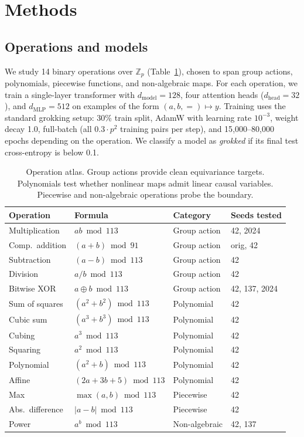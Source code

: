 \documentclass{article}
\newcommand{\Z}{\mathbb{Z}}
\begin{document}
\section{Methods}
\label{sec:methods}

\subsection{Operations and models}

We study 14 binary operations over $\Z_p$ (Table~\ref{tab:operations}), chosen
to span group actions, polynomials, piecewise functions, and non-algebraic maps.
For each operation, we train a single-layer transformer with
$d_\text{model} = 128$, four attention heads ($d_\text{head} = 32$), and
$d_\text{MLP} = 512$ on examples of the form $(a, b, {=}) \mapsto y$. Training
uses the standard grokking setup: 30\% train split, AdamW with learning rate
$10^{-3}$, weight decay 1.0, full-batch (all $0.3 \cdot p^2$ training pairs
per step), and 15{,}000--80{,}000 epochs depending on the operation. We
classify a model as \emph{grokked} if its final test cross-entropy is below 0.1.

\begin{table}[t]
\centering
\small
\begin{tabular}{llll}
\toprule
Operation & Formula & Category & Seeds tested \\
\midrule
Multiplication & $ab \bmod 113$ & Group action & 42, 2024 \\
Comp.\ addition & $(a{+}b) \bmod 91$ & Group action & orig, 42 \\
Subtraction & $(a{-}b) \bmod 113$ & Group action & 42 \\
Division & $a/b \bmod 113$ & Group action & 42 \\
Bitwise XOR & $a \oplus b \bmod 113$ & Group action & 42, 137, 2024 \\
\midrule
Sum of squares & $(a^2{+}b^2) \bmod 113$ & Polynomial & 42 \\
Cubic sum & $(a^3{+}b^3) \bmod 113$ & Polynomial & 42 \\
Cubing & $a^3 \bmod 113$ & Polynomial & 42 \\
Squaring & $a^2 \bmod 113$ & Polynomial & 42 \\
Polynomial & $(a^2{+}b) \bmod 113$ & Polynomial & 42 \\
Affine & $(2a{+}3b{+}5) \bmod 113$ & Polynomial & 42 \\
\midrule
Max & $\max(a,b) \bmod 113$ & Piecewise & 42 \\
Abs.\ difference & $|a{-}b| \bmod 113$ & Piecewise & 42 \\
Power & $a^b \bmod 113$ & Non-algebraic & 42, 137 \\
\bottomrule
\end{tabular}
\caption{Operation atlas. Group actions provide clean equivariance targets.
Polynomials test whether nonlinear maps admit linear causal variables. Piecewise
and non-algebraic operations probe the boundary.}
\label{tab:operations}
\end{table}
\end{document}
